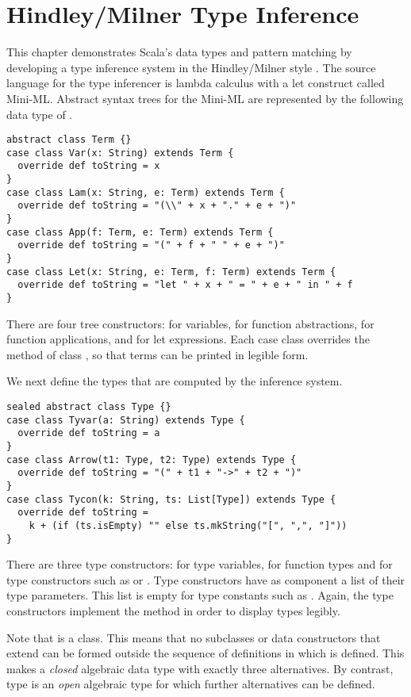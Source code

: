 {\chapter{\label{sec:hm}Hindley/Milner Type Inference}

This chapter demonstrates Scala's data types and pattern matching by
developing a type inference system in the Hindley/Milner style
\cite{milner:polymorphism}. The source language for the type inferencer is
lambda calculus with a let construct called Mini-ML. Abstract syntax
trees for the Mini-ML are represented by the following data type of
.
\begin{lstlisting}
abstract class Term {}
case class Var(x: String) extends Term {
  override def toString = x
}
case class Lam(x: String, e: Term) extends Term {
  override def toString = "(\\" + x + "." + e + ")"
}
case class App(f: Term, e: Term) extends Term {
  override def toString = "(" + f + " " + e + ")"
}
case class Let(x: String, e: Term, f: Term) extends Term {
  override def toString = "let " + x + " = " + e + " in " + f
}
\end{lstlisting}
There are four tree constructors:  for variables, 
for function abstractions,  for function applications, and
 for let expressions. Each case class overrides the
 method of class , so that terms can be
printed in legible form.

We next define the types that are
computed by the inference system.
\begin{lstlisting}
sealed abstract class Type {}
case class Tyvar(a: String) extends Type {
  override def toString = a
}
case class Arrow(t1: Type, t2: Type) extends Type {
  override def toString = "(" + t1 + "->" + t2 + ")"
}
case class Tycon(k: String, ts: List[Type]) extends Type {
  override def toString = 
    k + (if (ts.isEmpty) "" else ts.mkString("[", ",", "]"))
}
\end{lstlisting}
There are three type constructors:  for type variables,
 for function types and  for type constructors
such as  or . Type constructors have as
component a list of their type parameters. This list is empty for type
constants such as . Again, the type constructors
implement the  method in order to display types legibly.

Note that  is a  class. This means that no
subclasses or data constructors that extend  can be formed
outside the sequence of definitions in which  is defined.
This makes  a {\em closed} algebraic data type with exactly
three alternatives. By contrast, type  is an {\em open}
algebraic type for which further alternatives can be defined.

}

